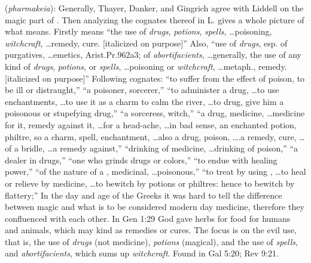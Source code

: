 \item[Witchcraft (use of),]

(\textit{pharmakeia}):
Generally, Thayer, Danker, and Gingrich agree with Liddell on the magic part of . Then analyzing the cognates thereof in L. gives a whole picture of what  means. Firstly  means ``the use of \emph{drugs}, \emph{potions}, \emph{spells}, \ldots poisoning, \emph{witchcraft}, \ldots remedy, cure. [italicized on purpose]'' Also, ``use of \emph{drugs}, esp. of purgatives, \ldots emetics, Arist.Pr.962a3; of \emph{abortifacients}, \ldots generally, the use of any kind of \emph{drugs}, \emph{potions}, or \emph{spells}, \ldots poisoning or \emph{witchcraft}, \ldots metaph., remedy. [italicized on purpose]'' Following cognates:  ``to suffer from the effect of poison, to be ill or distraught,''  ``a poisoner, sorcerer,''  ``to administer a drug, \ldots to use enchantments, \ldots to use it as a charm to calm the river, \ldots to drug, give him a poisonous or stupefying drug,''  ``a sorceress, witch,''  ``a drug, medicine, \ldots medicine for it, remedy against it, \ldots for a head-ache, \ldots in bad sense, an enchanted potion, philtre, so a charm, spell, enchantment, \ldots also a drug, poison, \ldots .a remedy, cure, \ldots of a bridle, \ldots a remedy against,''  ``drinking of medicine, \ldots drinking of poison,''  ``a dealer in drugs,''  ``one who grinds drugs or colors,''  ``to endue with healing power,''  ``of the nature of a , medicinal, \ldots poisonous,''  ``to treat by using , \ldots to heal or relieve by medicine, \ldots to bewitch by potions or philtres: hence to bewitch by flattery;'' In the day and age of the Greeks it was hard to tell the difference between magic and what is to be considered modern day medicine, therefore they confluenced with each other. In Gen 1:29 God gave herbs for food for humans and animals, which may kind as remedies or cures. The focus is on the evil use, that is, the use of \emph{drugs} (not medicine), \emph{potions} (magical), and the use of \emph{spells}, and \emph{abortifacients}, which sums up \emph{witchcraft}.
Found in Gal 5:20; Rev 9:21.
